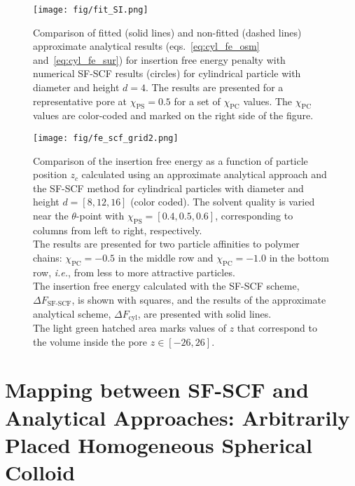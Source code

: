\documentclass[10pt, a4paper]{article}
\begin{document}
\begin{multicols}{2}
\begin{figure}[H]
    \centering
    \texttt{[image: fig/fit\_SI.png]}
    \caption{
    Comparison of fitted (solid lines) and non-fitted (dashed lines) approximate analytical results (eqs.~\ref{eq:cyl_fe_osm} and~\ref{eq:cyl_fe_sur}) for insertion free energy penalty with numerical SF-SCF results (circles) for cylindrical particle with diameter and height $d = 4$.
    The results are presented for a representative pore at $\chi_{\textrm{PS}} = 0.5$ for a set of $\chi_{\textrm{PC}}$ values.
    The $\chi_{\textrm{PC}}$ values are color-coded and marked on the right side of the figure.
    }
    \label{fig:fit_SI}
\end{figure}

\begin{figure}[H]
    \centering
    \texttt{[image: fig/fe\_scf\_grid2.png]}
    \caption{ 
    Comparison of the insertion free energy as a function of particle position $z_c$ calculated using an approximate analytical approach and the SF-SCF method for cylindrical particles with diameter and height $d = [8, 12, 16]$ (color coded).
    The solvent quality is varied near the $\theta$-point with $\chi_{\textrm{PS}} = [0.4, 0.5, 0.6]$, corresponding to columns from left to right, respectively.\\
    The results are presented for two particle affinities to polymer chains: $\chi_{\textrm{PC}} = -0.5$ in the middle row and $\chi_{\textrm{PC}} = -1.0$ in the bottom row, \emph{i.e.}, from less to more attractive particles.\\
    The insertion free energy calculated with the SF-SCF scheme, $\Delta F_{\textrm{SF-SCF}}$, is shown with squares, and the results of the approximate analytical scheme, $\Delta F_{\textrm{cyl}}$, are presented with solid lines.\\
    The light green hatched area marks values of $z$ that correspond to the volume inside the pore $z \in [-26, 26]$.
    \label{fig:fe_scf_grid}
    }
\end{figure}

\end{multicols}


\section{Mapping between SF-SCF and Analytical Approaches: Arbitrarily Placed Homogeneous Spherical Colloid}
\end{document}
